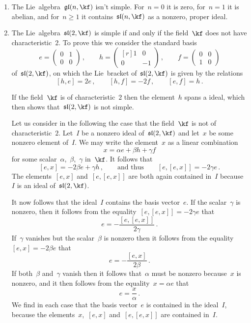 \begin{examples}
	\label{examples for simple lie algebras}
	\leavevmode
	\begin{enumerate}
		\item
			The Lie~algebra~$\gllie(n, \kf)$ isn’t simple.
			For~$n = 0$ it is zero, for~$n = 1$ it is abelian, and for~$n \geq 1$ it contains~$\sllie(n,\kf)$ as a nonzero, proper ideal.
		\item
			The Lie~algebra~$\sllie(2, \kf)$ is simple if and only if the field~$\kf$ does not have characteristic~$2$.
			To prove this we consider the standard basis
			\[
				e
				=
				\begin{pmatrix}
					0 & 1 \\
					0 & 0
				\end{pmatrix} \,,
				\qquad
				h
				=
				\begin{pmatrix*}[r]
					1 &  0  \\
					0 & -1
				\end{pmatrix*} \,,
				\qquad
				f
				=
				\begin{pmatrix}
					0 & 0 \\
					1 & 0
				\end{pmatrix}
			\]
			of~$\sllie(2, \kf)$, on which the Lie~bracket of~$\sllie(2, \kf)$ is given by the relations
			\[
				[h,e] = 2e  \,,
				\qquad
				[h,f] = -2 f \,,
				\qquad
				[e,f] = h \,.
			\]
			
			If the field~$\kf$ is of characteristic~$2$ then the element~$h$ spans a {\onedimensional} ideal, which then shows that~$\sllie(2, \kf)$ is not simple.
			
			Let us consider in the following the case that the field~$\kf$ is not of characteristic~$2$.
			Let~$I$ be a nonzero ideal of~$\sllie(2, \kf)$ and let~$x$ be some nonzero element of~$I$.
			We may write the element~$x$ as a linear combination
			\[
				x = \alpha e + \beta h + \gamma f
			\]
			for some scalar~$\alpha$,~$\beta$,~$\gamma$ in~$\kf$.
			It follows that
			\[
				[e,x]
				=
				-2 \beta e + \gamma h \,,
				\qquad \text{and thus}\qquad
				[e,[e,x]]
				=
				-2 \gamma e \,.
			\]
			The elements~$[e,x]$ and~$[e,[e,x]]$ are both again contained in~$I$ because~$I$ is an ideal of~$\sllie(2, \kf)$.

			It now follows that the ideal~$I$ contains the basis vector~$e$.
			If the scalar~$\gamma$ is nonzero, then it follows from the equality~$[e,[e,x]] = -2 \gamma e$ that
			\[
				e
				=
				- \frac{ [e,[e,x]] }{ 2\gamma } \,.
			\]
			If~$\gamma$ vanishes but the scalar~$\beta$ is nonzero then it follows from the equality$[e,x] = -2 \beta e$ that
			\[
				e
				=
				-\frac{ [e,x] }{ 2\beta } \,.
			\]
			If both~$\beta$ and~$\gamma$ vanish then it follows that~$\alpha$ must be nonzero because~$x$ is nonzero, and it then follows from the equality~$x = \alpha e$ that
			\[
				e = \frac{x}{\alpha} \,.
			\]
			We find in each case that the basis vector~$e$ is contained in the ideal~$I$, because the elements~$x$,~$[e,x]$ and~$[e,[e,x]]$ are contained in~$I$.
			

\end{enumerate}
\end{examples}
